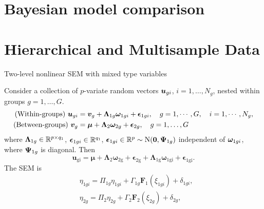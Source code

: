 \documentclass[10pt,a4paper]{book}
\begin{document}
\section{Bayesian model comparison}\label{sec:SEM_model_comp}



\section{Hierarchical and Multisample
Data}
\begin{defbox}{Two-level nonlinear SEM with mixed type variables}
	\begin{definition}
	Consider a collection of $p$-variate random vectors ${\boldsymbol u}_{gi}$, $i=1,\ldots,N_g$, nested within groups $g=1,\ldots,G$.   
	\begin{align*}
		\text{(Within-groups) }{\boldsymbol u}_{gi}&={\boldsymbol v}_{g}+{\boldsymbol\Lambda}_{1g}{\boldsymbol\omega}_{1gi}+{\boldsymbol\epsilon}_{1gi},\quad g=1,\cdots,G,\quad i=1,\cdots,N_{g},\\
		\text{(Between-groups) }{\boldsymbol v}_g&={\boldsymbol\mu}+{\boldsymbol\Lambda}_2{\boldsymbol\omega}_{2g}+{\boldsymbol\epsilon}_{2g},\quad g=1,\ldots,G
	\end{align*}
	where ${\boldsymbol\Lambda}_{1g}\in\mathbb R^{p\times q_1}$, ${\boldsymbol\epsilon}_{1gi}\in\mathbb R^{q_1}$, ${\boldsymbol\epsilon}_{1gi}\in\mathbb R^{p}\sim\mathrm{N}({\boldsymbol 0},{\boldsymbol\Psi}_{1g})$ independent of ${\boldsymbol\omega}_{1gi}$, where ${\boldsymbol\Psi}_{1g}$ is diagonal. Then 
	\begin{equation*}
		\mathbf{u}_{\mathrm{gi}}=\mathbf{\mu}+\mathbf{\Lambda}_{2}\mathbf{\omega}_{2\mathrm{g}}+\mathbf{\epsilon}_{2\mathrm{g}}+\mathbf{\Lambda}_{1\mathrm{g}}\mathbf{\omega}_{1\mathrm{gi}}+\mathbf{\epsilon}_{1\mathrm{gi}}.
	\end{equation*}  
	The SEM is 
	\begin{equation*}
		\begin{aligned}&\eta_{1gi}=\Pi_{1g}\eta_{1gi}+\Gamma_{1g}\mathbf{F}_1(\xi_{1gi})+\delta_{1gi},\\&\eta_{2g}=\Pi_2\eta_{2g}+\Gamma_2\mathbf{F}_2(\xi_{2g})+\delta_{2g},\end{aligned}
	\end{equation*}
	\end{definition}
\end{defbox}





\end{document}
